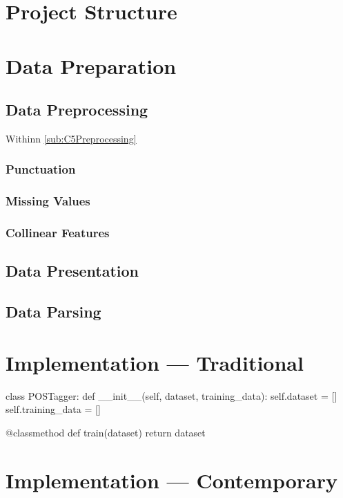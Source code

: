 \section{Project Structure}

\section{Data Preparation}

\subsection{Data Preprocessing}

Withinn \autoref{sub:C5Preprocessing}

\subsubsection{Punctuation}
\subsubsection{Missing Values}
\subsubsection{Collinear Features}

\subsection{Data Presentation}

\subsection{Data Parsing}

\section{Implementation --- Traditional}

\begin{python}
    class POSTagger:
        def __init__(self, dataset, training_data):
            self.dataset = []
            self.training_data = []

        @classmethod
        def train(dataset)
            return dataset
\end{python}

\section{Implementation --- Contemporary}

